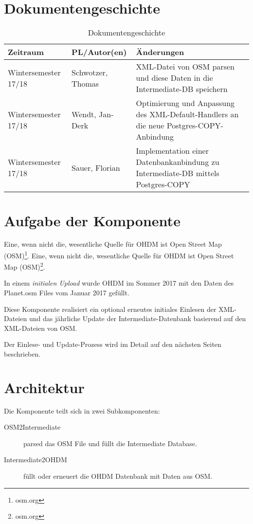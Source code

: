 \section{Dokumentengeschichte}
\begin{table}[h]
	\begin{tabular}{|l|l|p{4cm}|}
		\hline
		Zeitraum & PL/Autor(en) & Änderungen \\
		\hline
		Wintersemester 17/18 & Schwotzer, Thomas & XML-Datei von OSM parsen und diese Daten in die Intermediate-DB speichern\\
		\hline
		Wintersemester 17/18 & Wendt, Jan-Derk & Optimierung und Anpassung des XML-Default-Handlers an die neue Postgres-COPY-Anbindung\\
		\hline
		Wintersemester 17/18 & Sauer, Florian & Implementation einer Datenbankanbindung zu Intermediate-DB mittels Postgres-COPY \\
		\hline
	\end{tabular}
	\caption{Dokumentengeschichte}
\end{table}

\section{Aufgabe der Komponente}
Eine, wenn nicht die, wesentliche Quelle für OHDM ist Open Street 
Map (OSM)\footnote{osm.org}.
Eine, wenn nicht die, wesentliche Quelle für OHDM ist Open Street Map (OSM)\footnote{osm.org}.

In einem {\it initialen Upload} wurde OHDM im Sommer 2017 mit den Daten des Planet.osm Files vom Januar 2017 gefüllt.

Diese Komponente realisiert ein optional erneutes initiales Einlesen der XML-Dateien und das jährliche Update der Intermediate-Datenbank basierend auf den XML-Dateien von OSM.

Der Einlese- und Update-Prozess wird im Detail auf den nächsten Seiten beschrieben.

\section{Architektur}
Die Komponente teilt sich in zwei Subkomponenten:

\begin{description}
\item[OSM2Intermediate] 
parsed das OSM File und füllt die
Intermediate Database.

\item[Intermediate2OHDM] füllt oder erneuert die OHDM Datenbank 
mit Daten aus OSM.

\end{description}

